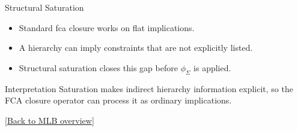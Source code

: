 \begin{frame}{Structural Saturation}
\hypertarget{appendix:saturation}{}
\begin{itemize}
    \item Standard \ac{fca} closure works on flat implications.
    \item A hierarchy can imply constraints that are not explicitly listed.
    \item Structural saturation closes this gap before $\phi_{\Sigma}$ is applied.
\end{itemize}

\vspace{0.35em}
\begin{center}
\end{center}

\vspace{0.35em}
\begin{block}{Interpretation}
Saturation makes indirect hierarchy information explicit, so the FCA closure operator can process it as ordinary implications.
\end{block}
{\tiny[\hyperlink{main:mlb-constraints}{Back to MLB overview}]}
\end{frame}

